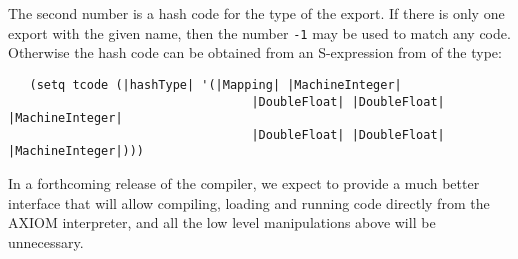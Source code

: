 The second number is a hash code for the type of the export.
If there is only one export with the given name, then the number {\tt -1}
may be used to match any code.  Otherwise the hash code can be obtained
from an S-expression from of the type:
\begin{verbatim}
   (setq tcode (|hashType| '(|Mapping| |MachineInteger|
                                  |DoubleFloat| |DoubleFloat| |MachineInteger|
                                  |DoubleFloat| |DoubleFloat| |MachineInteger|)))
\end{verbatim}

In a forthcoming release of the \asharp{} compiler, we expect to
provide a much better interface that will allow compiling, loading
and running code directly from the AXIOM interpreter, and all the
low level manipulations above will be unnecessary.


